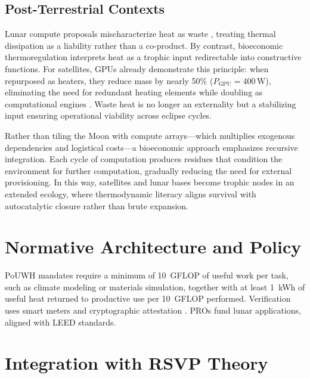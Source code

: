 \documentclass[11pt,a4paper]{article}
\theoremstyle{plain}
\theoremstyle{definition}
\theoremstyle{remark}
\begin{document}
\subsection{Post-Terrestrial Contexts}

Lunar compute proposals mischaracterize heat as waste \citep{shams2025},
treating thermal dissipation as a liability rather than a co-product. By
contrast, bioeconomic thermoregulation interprets heat as a trophic input
redirectable into constructive functions. For satellites, GPUs already
demonstrate this principle: when repurposed as heaters, they reduce mass by
nearly 50\% ($P_{\mathrm{GPU}} = 400\,\mathrm{W}$), eliminating the need for
redundant heating elements while doubling as computational engines
\citep{yuan2024}. Waste heat is no longer an externality but a stabilizing
input ensuring operational viability across eclipse cycles.

Rather than tiling the Moon with compute arrays---which multiplies exogenous
dependencies and logistical costs---a bioeconomic approach emphasizes recursive
integration. Each cycle of computation produces residues that condition the
environment for further computation, gradually reducing the need for external
provisioning. In this way, satellites and lunar bases become trophic nodes in
an extended ecology, where thermodynamic literacy aligns survival with
autocatalytic closure rather than brute expansion.

\section{Normative Architecture and Policy}
\label{sec:policy}

PoUWH mandates require a minimum of 10~GFLOP of useful work per task, such as climate modeling or materials simulation, together with at least 1~kWh of useful heat returned to productive use per 10~GFLOP performed.
Verification uses smart meters and cryptographic attestation \citep{eu2023}.
PROs fund lunar applications, aligned with LEED standards.

\section{Integration with RSVP Theory}
\label{sec:rsvp}
\end{document}
